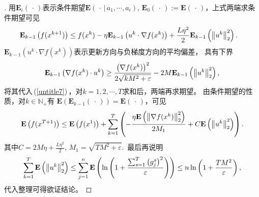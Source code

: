 \documentclass[9pt,aspectratio=169]{beamer}
\begin{document}
\begin{frame}
	\begin{proof}[]
		用$\mathbf{E}_{i}\left(\,\cdot\, \right)$表示条件期望$\mathbf{E}\left(\,\cdot \,|\,a_1,\cdots,a_i\right),\,\mathbf{E}_0\left(\,\cdot\,\right):=\mathbf{E}\left(\,\cdot\,\right)$，上式两端求条件期望可见
		\vspace{-0.05cm}\begin{align}\label{untitle7}
		\mathbf{E}_{k-1}\left( f(x^{k+1})\right)& \leq f(x^k)-\eta\mathbf{E}_{k-1}\left( u^k\cdot \nabla f(x^k)\right)+ \frac{L\eta^2}{2}\mathbf{E}_{k-1}\left(\left\|  u^k \right\|_2 ^2\right).
		\vspace{-0.1cm}\end{align}
 $\mathbf{E}_{k-1}\left( u^k\cdot \nabla f(x^k)\right)$表示更新方向与负梯度方向的平均偏差，
具有下界	\vspace{-0.15cm}\begin{equation}
	\mathbf{E}_{k-1}\left(\nabla f(x^k)\cdot u^k\right)\geq \frac{\left( \nabla  f(x^k) \right) ^2}{2\sqrt{kM^2+\varepsilon}}-2M \mathbf{E}_{k-1}\left(\left\| u^k  \right\|_2 ^2\right),
\vspace{-0.05cm}\end{equation}
将其代入\,(\ref{untitle7})\,，对$k=1,2,\cdots,T$求和后，两端再求期望。
由条件期望的性质，对$k\in \mathbb{N}_+$有
$\mathbf{E}\left(\mathbf{E}_{k-1}\left( \,\cdot\,\right)\right)=\mathbf{E}\left(\,\cdot\,\right)$，可见
\vspace{-0.2cm}\begin{equation}\label{qiuheshi2}
	\mathbf{E}\left(f(x^{T+1})\right)\leq \mathbf{E}\left(f(x^1)\right)+
	\sum_{k=1}^{T}\left( -\frac{\eta \mathbf{E}\left(\left\| \nabla f(x^k) \right\|_2 ^2\right)}{2M_1}+ C\mathbf{E}\left(\left\|  u^k \right\|_2 ^2\right)   \right).
	\vspace{-0.2cm}\end{equation}
	其中$C= 2M\eta+ \frac{L\eta^2}{2},\,M_1=\sqrt{TM^2+\varepsilon}$.\ 最后再说明
	\vspace{-0.05cm} \begin{equation}\label{untitle9}
        \sum_{k=1}^{T}\mathbf{E}\left(\left\|u^k \right\|_2 ^2\right)
\leq \sum_{j=1}^{n}\mathbf{E}\left(\ln \left( 1+\frac{\sum_{s=1}^{T}\left( g_j^s \right) ^2}{\varepsilon} \right) \right)
\leq   n \ln \left( 1+\frac{TM^2}{\varepsilon} \right),
\vspace{-0.05cm}\end{equation}
代入整理可得欲证结论。
\end{proof}

\end{frame}
\end{document}
